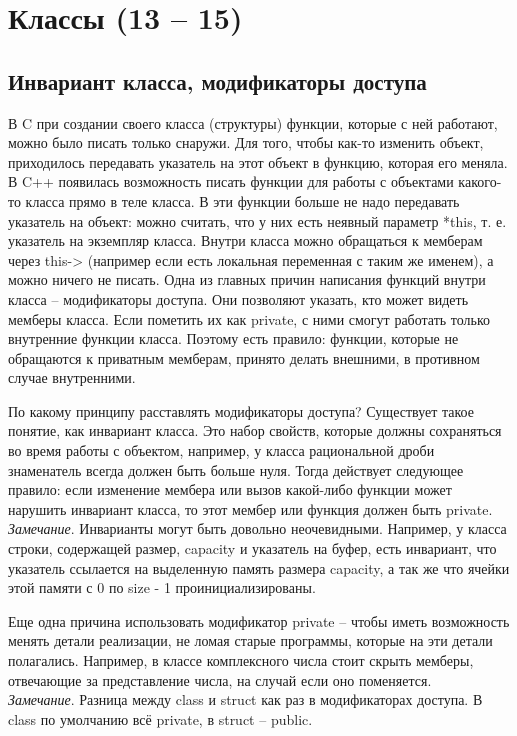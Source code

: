 \documentclass[12pt, a4paper]{article}
\begin{document}
	\section{Классы (13 -- 15)}
	\subsection{Инвариант класса, модификаторы доступа}
	В C при создании своего класса (структуры) функции, которые с ней работают, можно было писать только снаружи. Для того, чтобы как-то изменить объект, приходилось передавать указатель на этот объект в функцию, которая его меняла. В C++ появилась возможность писать функции для работы с объектами какого-то класса прямо в теле класса. В эти функции больше не надо передавать указатель на объект: можно считать, что у них есть неявный параметр *this, т. е. указатель на экземпляр класса. Внутри класса можно обращаться к мемберам через this-> (например если есть локальная переменная с таким же именем), а можно ничего не писать. Одна из главных причин написания функций внутри класса -- модификаторы доступа. Они позволяют указать, кто может видеть мемберы класса. Если пометить их как private, с ними смогут работать только внутренние функции класса. Поэтому есть правило: функции, которые не обращаются к приватным мемберам, принято делать внешними, в противном случае внутренними.\\\par 
	По какому принципу расставлять модификаторы доступа? Существует такое понятие, как инвариант класса. Это набор свойств, которые должны сохраняться во время работы с объектом, например, у класса рациональной дроби знаменатель всегда должен быть больше нуля. Тогда действует следующее правило: если изменение мембера или вызов какой-либо функции может нарушить инвариант класса, то этот мембер или функция должен быть private.\\
	\textit{Замечание}. Инварианты могут быть довольно неочевидными. Например, у класса строки, содержащей размер, capacity и указатель на буфер, есть инвариант, что указатель ссылается на выделенную память размера capacity, а так же что ячейки этой памяти с 0 по size - 1 проинициализированы.\\\par 
	Еще одна причина использовать модификатор private -- чтобы иметь возможность менять детали реализации, не ломая старые программы, которые на эти детали полагались. Например, в классе комплексного числа стоит скрыть мемберы, отвечающие за представление числа, на случай если оно поменяется.
	\\\textit{Замечание}. Разница между class и struct как раз в модификаторах доступа. В class по умолчанию всё private, в struct -- public.
\end{document}

